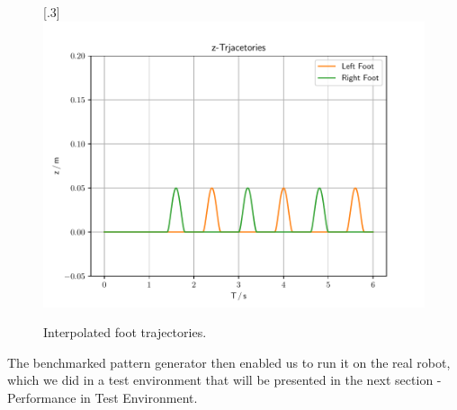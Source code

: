 \begin{figure}[h!]
	[.3\linewidth]{\includegraphics[scale=.3]{chapters/05_experiments/01_user_controlled_walking/01_benchmarking/interpolated_z_trajectories.pdf}}
	\caption{Interpolated foot trajectories.}
	\label{fig::511_benchmarking_inter}
\end{figure}
 The benchmarked pattern generator then enabled us to run it on the real robot, which we did in a test environment that will be presented in the next section - Performance in Test Environment.
